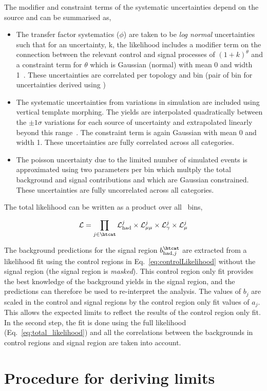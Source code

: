 The modifier and constraint terms of the systematic uncertainties depend on the source
and can be summarised as,
\begin{itemize}
\item The transfer factor systematics ($\phi$) are taken to be \emph{log normal} uncertainties
such that for an uncertainty, k, the likelihood includes a modifier term on
the connection between the relevant control and signal processes of $(1+k)^{\theta}$ and a constraint term for $\theta$ which 
is Gaussian (normal) with mean 0 and width 1~\cite{templateMorphing}. These uncertainties 
are correlated per topology and \scalht bin (pair of \scalht bin for uncertainties derived using \mmj)
\item The systematic uncertainties from variations in simulation are included using vertical template morphing.
The yields are interpolated quadratically between the $\pm 1\sigma$ variations for each source of
uncertainty and extrapolated linearly beyond this range~\cite{templateMorphing}. The constraint term is again Gaussian
with mean 0 and width 1. These uncertainties are fully correlated across all categories.
\item The poisson uncertainty due to the limited number of simulated events is approximated using
two parameters per bin which multply the total background and signal contributions and which 
are Gaussian constrained. These uncertainties are fully uncorrelated across all categories.
\end{itemize}

The total likelihood can be written as a product over all \htcat~bins,

\begin{equation}
\mathcal{L} = \prod_{j\in\htcat} \mathcal{L}^{j}_{\mathrm{had}} \times \mathcal{L}^{j}_{\mathrm{\mu\mu}} \times \mathcal{L}^{j}_{\mathrm{\gamma}} \times \mathcal{L}^{j}_{\mathrm{\mu}}
\end{equation}

The background predictions for the signal region $b^{\htcat}_{\mathrm{had},j}$ are extracted from a likelihood fit 
using the control regions in Eq.~\ref{eq:controlLikelihood} without the signal region (the signal region is \emph{masked}). 
This control region only fit provides the best knowledge of the background yields in the signal region, 
and the predictions can therefore be used to re-interpret the analysis. The values of $b_j$ are 
scaled in the control and signal regions by the control region only fit values of $a_j$.
This allows the expected limits to reflect the results of the control region only fit.
In the second step, the fit is done using the full likelihood (Eq.~\ref{eq:total_likelihood}) and all 
the correlations between the backgrounds in control regions and signal region are taken into account.

\section{Procedure for deriving limits}
